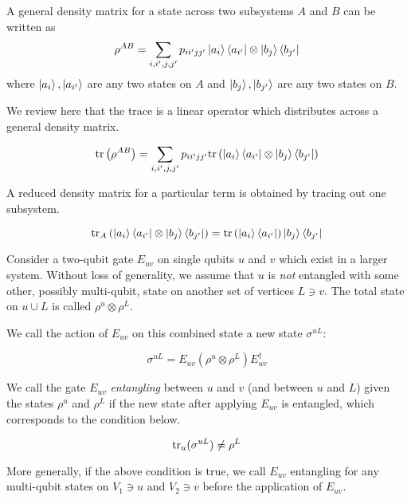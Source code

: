 A general density matrix for a state across two subsystems $A$ and $B$ can be
written as
\begin{equation}
\rho^{AB} = \sum_{i,i',j,j'} p_{ii'jj'} \left\vert{a_i}\right\rangle\left\langle{a_{i'}}\right\vert \otimes \left\vert{b_j}\right\rangle\left\langle{b_{j'}}\right\vert
\end{equation}
where $\left\vert{a_i}\right\rangle,\left\vert{a_{i'}}\right\rangle$ are any two states on $A$ and
$\left\vert{b_j}\right\rangle,\left\vert{b_{j'}}\right\rangle$ are any two states on $B$.

We review here that the trace is a linear operator which distributes across
a general density matrix.

\begin{equation}
\text{tr}\left(\rho^{AB}\right) = \sum_{i,i',j,j'} p_{ii'jj'} \text{tr} \left(\left\vert{a_i}\right\rangle\left\langle{a_{i'}}\right\vert \otimes \left\vert{b_j}\right\rangle\left\langle{b_{j'}}\right\vert\right)
\end{equation}

A reduced density matrix for a particular term is obtained by tracing out
one subsystem.

\begin{equation}
\text{tr}_A\left(\left\vert{a_i}\right\rangle\left\langle{a_{i'}}\right\vert \otimes \left\vert{b_j}\right\rangle\left\langle{b_{j'}}\right\vert\right) = \text{tr}\left(\left\vert{a_i}\right\rangle\left\langle{a_{i'}}\right\vert\right) \left\vert{b_j}\right\rangle\left\langle{b_{j'}}\right\vert
\end{equation}

Consider a two-qubit gate $E_{uv}$ on single qubits $u$ and $v$ which exist
in a larger system.
Without loss of generality, we assume that $u$ is
\emph{not} entangled with some other, possibly multi-qubit,
state on another set of vertices $L \ni v$.
The total state on $u \cup L$ is called $\rho^{u}\otimes \rho^{L}$.

We call the action of $E_{uv}$ on this combined state a new state $\sigma^{uL}$:

\begin{equation}
\sigma^{uL} = E_{uv} (\rho^{u}\otimes \rho^{L}) E^{\dagger}_{uv}
\end{equation}

We call the gate $E_{uv}$ \emph{entangling} between $u$ and $v$
(and between $u$ and $L$) given the states $\rho^{u}$ and $\rho^{L}$ if
the new state after applying $E_{uv}$ is entangled, which corresponds to
the condition below.

\begin{equation}
\text{tr}_{u}( \sigma^{uL} ) \ne \rho^{L}
\end{equation}

More generally, if the above condition is true,
we call $E_{uv}$ entangling for any multi-qubit
states on $V_1 \ni u$ and $V_2 \ni v$ before the application of $E_{uv}$.

